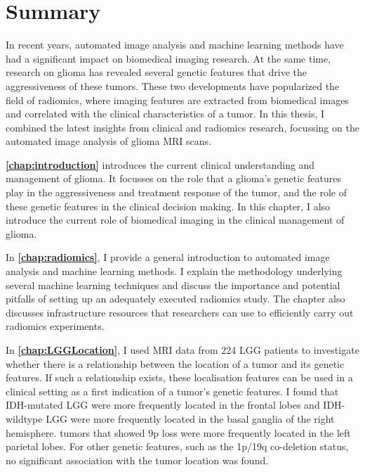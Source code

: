 \chapter{Summary}
\begin{ChapterAbstractNoTitle}
\end{ChapterAbstractNoTitle}

In recent years, automated image analysis and machine learning methods have had a significant impact on biomedical imaging research.
At the same time, research on glioma has revealed several genetic features that drive the aggressiveness of these \glspl{tumor}.
These two developments have popularized the field of radiomics, where imaging features are extracted from biomedical images and correlated with the clinical characteristics of a \gls{tumor}.
In this thesis, I combined the latest insights from clinical and radiomics research, focussing on the automated image analysis of glioma \gls{MRI} scans.

\textbf{\cref{chap:introduction}} introduces the current clinical understanding and management of glioma.
It focusses on the role that a glioma's genetic features play in the aggressiveness and treatment response of the \gls{tumor}, and the role of these genetic features in the clinical decision making.
In this chapter, I also introduce the current role of biomedical imaging in the clinical management of glioma.

In \textbf{\cref{chap:radiomics}}, I provide a general introduction to automated image analysis and machine learning methods.
I explain the methodology underlying several machine learning techniques and discuss the importance and potential pitfalls of setting up an adequately executed radiomics study.
The chapter also discusses infrastructure resources that researchers can use to efficiently carry out radiomics experiments.

In \textbf{\cref{chap:LGGLocation}}, I used MRI data from 224 \gls{LGG} patients to investigate whether there is a relationship between the location of a \gls{tumor} and its genetic features.
If such a relationship exists, these localisation features can be used in a clinical setting as a first indication of a \gls{tumor}'s genetic features.
I found that \gls{IDH}-mutated \gls{LGG} were more frequently located in the frontal lobes and \gls{IDH}-wildtype \gls{LGG} were more frequently located in the basal ganglia of the right hemisphere.
\Glspl{tumor} that showed 9p loss were more frequently located in the left parietal lobes.
For other genetic features, such as the 1p/19q co-deletion status, no significant association with the \gls{tumor} location was found.

